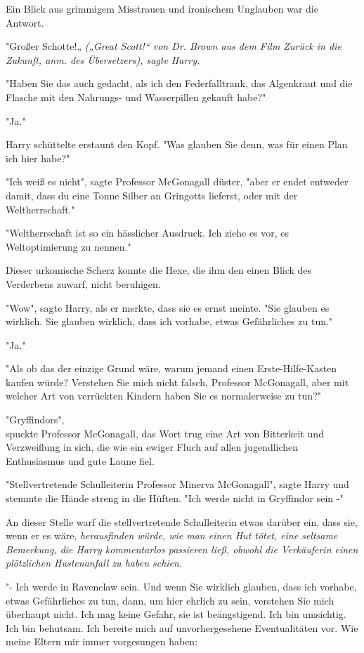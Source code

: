 {Ein Blick aus grimmigem Misstrauen und ironischem Unglauben war die Antwort.

"Großer Schotte!„ \emph{(„Great Scott!“ von Dr. Brown aus dem Film Zurück in die Zukunft, anm. des Übersetzers), sagte Harry.}

"Haben Sie das auch gedacht, als ich den Federfalltrank, das Algenkraut und die Flasche mit den Nahrungs- und Wasserpillen gekauft habe?"

"Ja."

Harry schüttelte erstaunt den Kopf. "Was glauben Sie denn, was für einen Plan ich hier habe?"

"Ich weiß es nicht", sagte Professor McGonagall düster, "aber er endet entweder damit, dass du eine Tonne Silber an Gringotts lieferst, oder mit der Weltherrschaft."

"Weltherrschaft ist so ein hässlicher Ausdruck. Ich ziehe es vor, es Weltoptimierung zu nennen."

Dieser urkomische Scherz konnte die Hexe, die ihm den einen Blick des Verderbens zuwarf, nicht beruhigen.

"Wow", sagte Harry, als er merkte, dass sie es ernst meinte. "Sie glauben es wirklich. Sie glauben wirklich, dass ich vorhabe, etwas Gefährliches zu tun."

"Ja."

"Als ob das der einzige Grund wäre, warum jemand einen Erste-Hilfe-Kasten kaufen würde? Verstehen Sie mich nicht falsch, Professor McGonagall, aber mit welcher Art von verrückten Kindern haben Sie es normalerweise zu tun?"

"Gryffindors",\\ spuckte Professor McGonagall, das Wort trug eine Art von Bitterkeit und Verzweiflung in sich, die wie ein ewiger Fluch auf allen jugendlichen Enthusiasmus und gute Laune fiel.

"Stellvertretende Schulleiterin Professor Minerva McGonagall", sagte Harry und stemmte die Hände streng in die Hüften. "Ich werde nicht in Gryffindor sein -"

An dieser Stelle warf die stellvertretende Schulleiterin etwas darüber ein, dass sie, wenn er es wäre, \emph{herausfinden würde, wie man einen Hut tötet, eine seltsame Bemerkung, die Harry kommentarlos passieren ließ, obwohl die Verkäuferin einen plötzlichen Hustenanfall zu haben schien.}

"- Ich werde in Ravenclaw sein. Und wenn Sie wirklich glauben, dass ich vorhabe, etwas Gefährliches zu tun, dann, um hier ehrlich zu sein, verstehen Sie mich überhaupt nicht. Ich mag keine Gefahr, sie ist beängstigend. Ich bin umsichtig. Ich bin behutsam. Ich bereite mich auf unvorhergesehene Eventualitäten vor. Wie meine Eltern mir immer vorgesungen haben:

}
